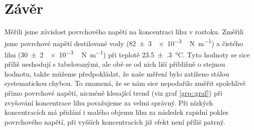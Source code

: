 \section*{Závěr}
Měřili jsme  závislost povrchového napětí na koncentraci lihu v roztoku.
Změřili jsme povrchové napětí destilované vody (\SI{82(3)}{\num{e-3}\,\si{\newton \per \metre}}) a čistého lihu (\SI{30(2)}{\num{e-3}\,\si{\newton \per \metre}}) při teplotě \SI{23.5(3)}{\degreeCelsius}.
Tyto hodnoty se sice příliš neshodují s tabelovanými, ale obě se od nich liší přibližně o stejnou hodnotu, takže můžeme předpokládat, že naše měření bylo zatíženo stálou systematickou chybou.
To znamená, že se nám sice nepodařilo změřit spolehlivě přímo povrchové napětí, nicméně klesající trend (viz graf \ref{grp::graf}) při zvyšování koncentrace lihu považujeme za velmi správný.
Při nízkých koncentracích má přidání i malého objemu lihu za následek rapidní pokles povrchového napětí, při vyšších koncentracích již efekt není příliš patrný.